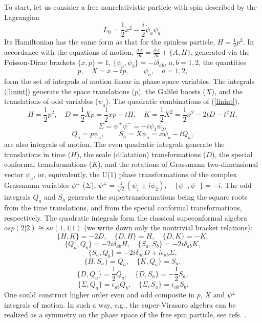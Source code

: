 \documentclass[a4paper,12pt]{article}
\begin{document}
To start, let us consider a free nonrelativistic particle
with spin
described by the Lagrangian
$$
L_0=\frac{1}{2}\dot{x}{}^2
-\frac{i}{2}\dot{\psi}_a\psi_a.
$$
Its  Hamiltonian has the same form as that
for the spinless particle,
$
H=\frac{1}{2}p^2.
$
In accordance with the equations of motion,
$\frac{dA}{dt}=\frac{\partial A}{\partial t}
+\{A,H\}$, generated via the
Poisson-Dirac brackets $\{x,p\}=1$,
$\{\psi_a,\psi_b\}=-i\delta_{ab}$,
$a,b=1,2$,
the
quantities
\begin{equation}
p,\quad
X=x-tp,\qquad
\psi_a,\quad
a=1,2,
\label{linint}
\end{equation}
form the set of integrals of motion
linear in phase space variables.
The integrals (\ref{linint}) generate the
space translations
($p$), the Galilei boosts
($X$), and the translations of odd variables
($\psi_a$).
The quadratic combinations of (\ref{linint}),
\begin{equation}
H=\frac{1}{2}p^2,\quad
D=\frac{1}{2}Xp=\frac{1}{2}xp-tH,\quad
K=\frac{1}{2}X^2=\frac{1}{2}x^2-2tD-t^2H,
\label{2even}
\end{equation}
\begin{equation}
\Sigma=\psi^+\psi^-=-i\psi_1\psi_2,
\label{sig}
\end{equation}
\begin{equation}
Q_a=p\psi_a,\qquad
S_a=X\psi_a=x\psi_a-tQ_a,
\label{qs}
\end{equation}
are also integrals of motion.
The even quadratic integrals
generate the translations in time ($H$),
the scale  (dilatation)
transformations ($D$), the special conformal
transformations ($K$), and the rotations of Grassmann
two-dimensional vector
$\psi_a$, or, equivalently, the U(1) phase
transformations
of the complex
Grassmann variables $\psi^\pm$  ($\Sigma$),
$
\psi^\pm=\frac{1}{\sqrt{2}}(\psi_1\pm i\psi_2),\quad
\{\psi^+,\psi^-\}=-i.
$
The odd integrals $Q_a$ and $S_a$
generate the
supertransformations
being the square roots from the time translations,
and from the special conformal transformations,
respectively.
The quadratic integrals form the classical
supeconformal algebra $osp(2|2)\cong su(1,1|1)$
(we write down only the nontrivial bracket relations):
$$
\{H,K\}=-2D,\quad
\{D,H\}=H,\quad
\{D,K\}=-K,
$$
$$
\{Q_a,Q_b\}=-2i\delta_{ab}H,\quad
\{S_a,S_b\}=-2i\delta_{ab}K,
$$
$$
\{S_a,Q_b\}=-2i\delta_{ab}D+i\epsilon_{ab}\Sigma,
$$
\begin{equation}
\{H,S_a\}=Q_a,\quad
\{K,Q_a\}=S_a,
\label{scon0}
\end{equation}
$$
\{D,Q_a\}=\frac{1}{2}Q_a,\quad
\{D,S_a\}=-\frac{1}{2}S_a,
$$
$$
\{\Sigma,Q_a\}=\epsilon_{ab}Q_b,\quad
\{\Sigma,S_a\}=\epsilon_{ab}S_b.
$$
One could construct higher order even and odd
composite in  $p$, $X$ and $\psi^\pm$
integrals of motion.
In such a way, e.g.,
the super-Virasoro algebra
can be realized as a symmetry
on the phase space
of the free spin particle, see refs. \cite{Kum,CKZ}.
\end{document}
